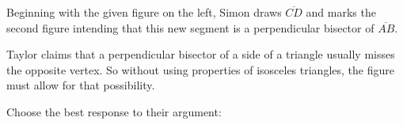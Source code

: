 \documentclass[nooutcomes]{ximera}
\begin{document}
\begin{problem}
Beginning with the given figure on the left, Simon draws $\overline{CD}$ and marks the second figure intending that this new segment is a perpendicular bisector of $\overline{AB}$.

Taylor claims that a perpendicular bisector of a side of a triangle usually misses the opposite vertex.  So without using properties of isosceles triangles, the figure must allow for that possibility.  

Choose the best response to their argument: 
\begin{multipleChoice}
\end{multipleChoice} 
\end{problem}
\end{document}

